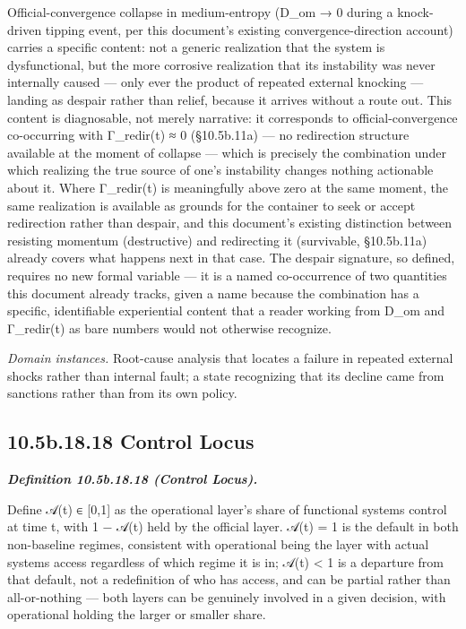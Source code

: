 \documentclass[
]{article}
\begin{document}
Official-convergence collapse in medium-entropy (D\_om → 0 during a
knock-driven tipping event, per this document's existing
convergence-direction account) carries a specific content: not a generic
realization that the system is dysfunctional, but the more corrosive
realization that its instability was never internally caused --- only
ever the product of repeated external knocking --- landing as despair
rather than relief, because it arrives without a route out. This content
is diagnosable, not merely narrative: it corresponds to
official-convergence co-occurring with Γ\_redir(t) ≈ 0 (§10.5b.11a) ---
no redirection structure available at the moment of collapse --- which
is precisely the combination under which realizing the true source of
one's instability changes nothing actionable about it. Where Γ\_redir(t)
is meaningfully above zero at the same moment, the same realization is
available as grounds for the container to seek or accept redirection
rather than despair, and this document's existing distinction between
resisting momentum (destructive) and redirecting it (survivable,
§10.5b.11a) already covers what happens next in that case. The despair
signature, so defined, requires no new formal variable --- it is a named
co-occurrence of two quantities this document already tracks, given a
name because the combination has a specific, identifiable experiential
content that a reader working from D\_om and Γ\_redir(t) as bare numbers
would not otherwise recognize.

\emph{Domain instances.} Root-cause analysis that locates a failure in
repeated external shocks rather than internal fault; a state recognizing
that its decline came from sanctions rather than from its own policy.

\hypertarget{b.18.18-control-locus}{%
\subsection{10.5b.18.18 Control Locus}\label{b.18.18-control-locus}}

\emph{\textbf{Definition 10.5b.18.18 (Control Locus).}}

Define 𝒜(t) ∈ {[}0,1{]} as the operational layer's share of functional
systems control at time t, with 1 − 𝒜(t) held by the official layer.
𝒜(t) = 1 is the default in both non-baseline regimes, consistent with
operational being the layer with actual systems access regardless of
which regime it is in; 𝒜(t) \textless{} 1 is a departure from that
default, not a redefinition of who has access, and can be partial rather
than all-or-nothing --- both layers can be genuinely involved in a given
decision, with operational holding the larger or smaller share.
\end{document}
